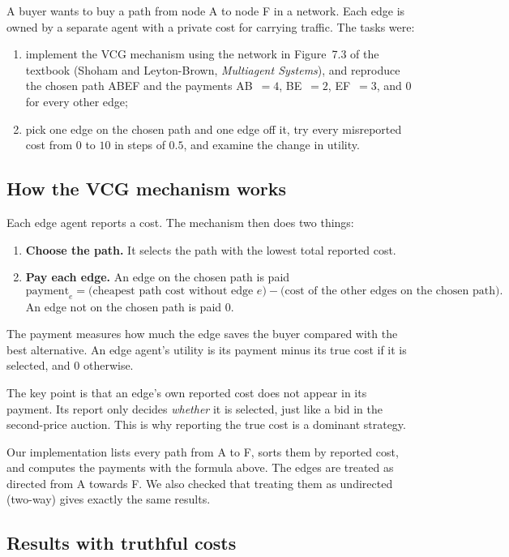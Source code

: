 \documentclass[11pt,a4paper]{article}
\begin{document}
A buyer wants to buy a path from node A to node F in a network. Each edge is owned by a separate agent with a private cost for carrying traffic. The tasks were:
\begin{enumerate}
  \item implement the VCG mechanism using the network in Figure~7.3 of the textbook (Shoham and Leyton-Brown, \emph{Multiagent Systems}), and reproduce the chosen path ABEF and the payments AB~$=4$, BE~$=2$, EF~$=3$, and $0$ for every other edge;
  \item pick one edge on the chosen path and one edge off it, try every misreported cost from $0$ to $10$ in steps of $0.5$, and examine the change in utility.
\end{enumerate}

\subsection{How the VCG mechanism works}

Each edge agent reports a cost. The mechanism then does two things:
\begin{enumerate}
  \item \textbf{Choose the path.} It selects the path with the lowest total reported cost.
  \item \textbf{Pay each edge.} An edge on the chosen path is paid
  \[
    \text{payment}_e=\Big(\text{cheapest path cost without edge } e\Big)-\Big(\text{cost of the other edges on the chosen path}\Big).
  \]
  An edge not on the chosen path is paid $0$.
\end{enumerate}
The payment measures how much the edge saves the buyer compared with the best alternative. An edge agent's utility is its payment minus its true cost if it is selected, and $0$ otherwise.

The key point is that an edge's own reported cost does not appear in its payment. Its report only decides \emph{whether} it is selected, just like a bid in the second-price auction. This is why reporting the true cost is a dominant strategy.

Our implementation lists every path from A to F, sorts them by reported cost, and computes the payments with the formula above. The edges are treated as directed from A towards F. We also checked that treating them as undirected (two-way) gives exactly the same results.

\subsection{Results with truthful costs}
\end{document}

